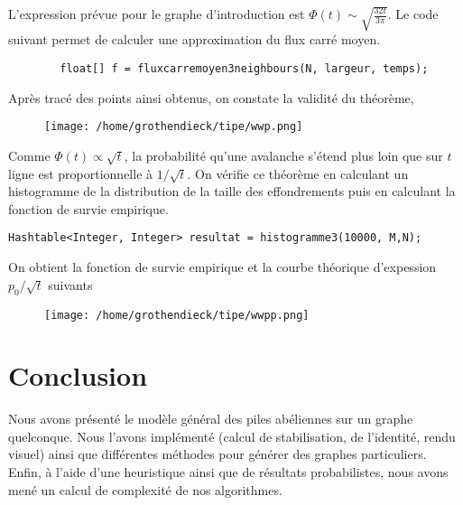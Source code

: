 \documentclass{article}
\begin{document}
L'expression prévue pour le graphe d'introduction est $\Phi(t) \sim \sqrt{\frac{32 t}{3\pi}}$. Le code suivant permet de calculer une approximation du flux carré moyen.  
\begin{lstlisting}
        float[] f = fluxcarremoyen3neighbours(N, largeur, temps);
\end{lstlisting}

Après tracé des points ainsi obtenus, on constate la validité du théorème, 
\begin{figure}[h]
	\centering
	\texttt{[image: /home/grothendieck/tipe/wwp.png]}
\end{figure}

Comme $\Phi(t)\propto \sqrt{t}$, la probabilité qu'une avalanche s'étend plus loin que sur $t$ ligne est proportionnelle à $1/\sqrt{t}$. On vérifie ce théorème en calculant un histogramme de la distribution de la taille des effondrements puis en calculant la fonction de survie empirique.
\begin{lstlisting}
Hashtable<Integer, Integer> resultat = histogramme3(10000, M,N);
\end{lstlisting}

On obtient la fonction de survie empirique et la courbe théorique d'expession $p_0/\sqrt{t}$ suivants
\begin{figure}[h]
	\centering
	\texttt{[image: /home/grothendieck/tipe/wwpp.png]}
\end{figure}
\section{Conclusion}
Nous avons présenté le modèle général des piles abéliennes sur un graphe quelconque. Nous l'avons implémenté (calcul de stabilisation, de l'identité, rendu visuel) ainsi que différentes méthodes pour générer des graphes particuliers. Enfin, à l'aide d'une heuristique ainsi que de résultats probabilistes, nous avons mené un calcul de complexité de nos algorithmes.
\end{document}
